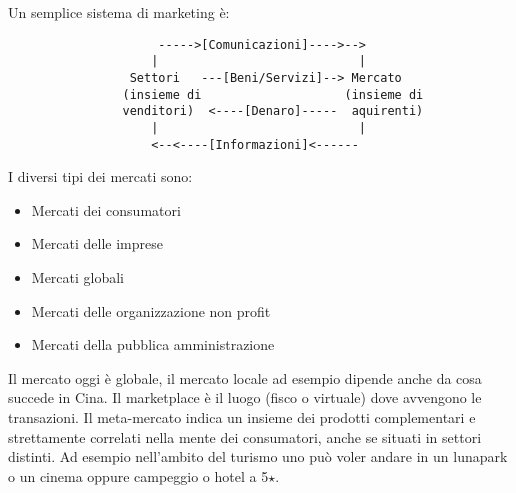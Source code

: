 \documentclass[11pt]{article}
\begin{document}
\noindent Un semplice sistema di marketing è:
\begin{verbatim}
                     ----->[Comunicazioni]---->-->
                    |                            |
                 Settori   ---[Beni/Servizi]--> Mercato
                (insieme di                    (insieme di
                venditori)  <----[Denaro]-----  aquirenti)
                    |                            |
                    <--<----[Informazioni]<------
\end{verbatim}

\noindent I diversi tipi dei mercati sono:
\begin{itemize}[noitemsep, topsep=0ex]
	\item Mercati dei consumatori
	\item Mercati delle imprese
	\item Mercati globali
	\item Mercati delle organizzazione non profit
	\item Mercati della pubblica amministrazione
\end{itemize}

\noindent
Il mercato oggi è globale, il mercato locale ad esempio dipende anche da cosa succede in Cina. 
Il marketplace è il luogo (fisco o virtuale) dove avvengono le transazioni.
Il meta-mercato indica un insieme dei prodotti complementari e strettamente correlati nella mente dei consumatori, anche se situati in settori distinti. Ad esempio nell'ambito del turismo uno può voler andare in un lunapark o un cinema oppure campeggio o hotel a 5$\star$.
~\\
\end{document}
